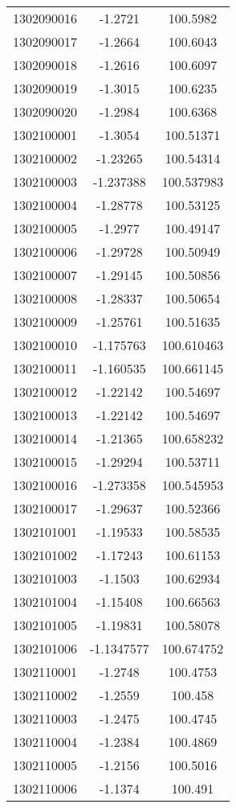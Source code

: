 \begin{longtable}{@{}lcc@{}}
1302090016 & -1.2721 & 100.5982\\ 
1302090017 & -1.2664 & 100.6043\\ 
1302090018 & -1.2616 & 100.6097\\ 
1302090019 & -1.3015 & 100.6235\\ 
1302090020 & -1.2984 & 100.6368\\ 
1302100001 & -1.3054 & 100.51371\\ 
1302100002 & -1.23265 & 100.54314\\ 
1302100003 & -1.237388 &  100.537983\\ 
1302100004 & -1.28778 & 100.53125\\ 
1302100005 & -1.2977 & 100.49147\\ 
1302100006 & -1.29728 & 100.50949\\ 
1302100007 & -1.29145 & 100.50856\\ 
1302100008 & -1.28337 & 100.50654\\ 
1302100009 & -1.25761 & 100.51635\\ 
1302100010 & -1.175763 &  100.610463\\ 
1302100011 & -1.160535 &  100.661145\\ 
1302100012 & -1.22142 & 100.54697\\ 
1302100013 & -1.22142 & 100.54697\\ 
1302100014 & -1.21365 & 100.658232\\ 
1302100015 & -1.29294 & 100.53711\\ 
1302100016 & -1.273358 &  100.545953\\ 
1302100017 & -1.29637 & 100.52366\\ 
1302101001 & -1.19533 & 100.58535\\ 
1302101002 & -1.17243 & 100.61153\\ 
1302101003 & -1.1503 & 100.62934\\ 
1302101004 & -1.15408 & 100.66563\\ 
1302101005 & -1.19831 & 100.58078\\ 
1302101006 & -1.1347577 & 100.674752\\ 
1302110001 & -1.2748 & 100.4753\\ 
1302110002 & -1.2559 & 100.458\\ 
1302110003 & -1.2475 & 100.4745\\ 
1302110004 & -1.2384 & 100.4869\\ 
1302110005 & -1.2156 & 100.5016\\ 
1302110006 & -1.1374 & 100.491\\ 

\end{longtable}

